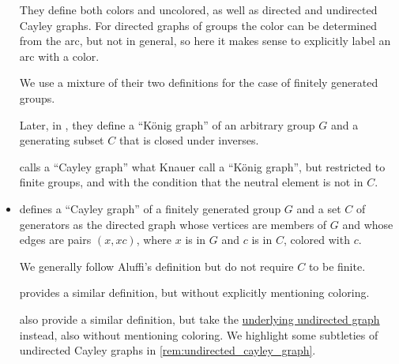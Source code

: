 \begin{remark}
\begin{itemize}
    They define both colors and uncolored, as well as directed and undirected Cayley graphs. For directed graphs of groups the color can be determined from the arc, but not in general, so here it makes sense to explicitly label an arc with a color.

    We use a mixture of their two definitions for the case of finitely generated groups.

    Later, in \cite[def. 7.3.2]{Knauer2019AlgebraicGraphTheory}, they define a \enquote{K\"onig graph} of an arbitrary group \( G \) and a generating subset \( C \) that is closed under inverses.

     calls a \enquote{Cayley graph} what Knauer call a \enquote{K\"onig graph}, but restricted to finite groups, and with the condition that the neutral element is not in \( C \).

    \item {} defines a \enquote{Cayley graph} of a finitely generated group \( G \) and a set \( C \) of generators as the directed graph whose vertices are members of \( G \) and whose edges are pairs \( (x, xc) \), where \( x \) is in \( G \) and \( c \) is in \( C \), colored with \( c \).

    We generally follow Aluffi's definition but do not require \( C \) to be finite.

     provides a similar definition, but without explicitly mentioning coloring.

     also provide a similar definition, but take the \hyperref[def:multigraph_orientation]{underlying undirected graph} instead, also without mentioning coloring. We highlight some subtleties of undirected Cayley graphs in \cref{rem:undirected_cayley_graph}.
  \end{itemize}
\end{remark}

